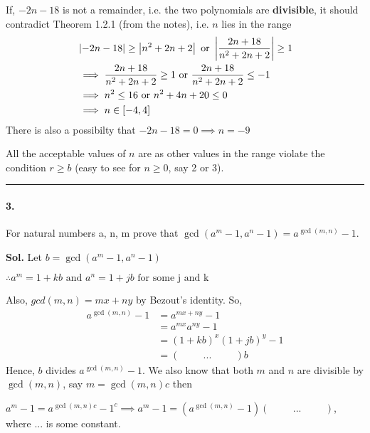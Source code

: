 \documentclass[12pt]{amsart}
\begin{document}
If, $-2n-18$ is not a remainder, i.e. the two polynomials are \textbf{divisible}, it should contradict Theorem 1.2.1 (from the notes), i.e. $n$ lies in the range
\begin{align*}
    &\left|{-2n-18}\right|\geq \left|{n^2+2n+2} \right| \text{ or } \left|\frac{2n+18}{n^2+2n+2}\right|\geq1 \\
    &\implies \frac{2n+18}{n^2+2n+2}\geq1 \text{ or } \frac{2n+18}{n^2+2n+2}\leq-1 \\ 
    \bigskip
    &\implies n^2 \leq 16 \text{ or } n^2+4n+20\leq0 \\
    &\implies n \in [-4, 4]
\end{align*}
\[\]
There is also a possibilty that $-2n-18=0 \implies n=-9 $

All the acceptable values of $n$ are  as other values in the range violate the condition $r \ge b$ (easy to see for $n \ge 0 $, say 2 or 3).


\par\noindent\textcolor{gray}{\rule{\textwidth}{0.5pt}}
\smallskip

\paragraph*{3.} For natural numbers a, n, m prove that $\gcd\left(a^{m}-1,a^{n}-1\right)=a^{\gcd(m,n)}-1$.

\bigskip
\textbf{Sol.}
Let $b = \gcd{(a^{m}-1,a^{n}-1)}$

$
\therefore a^m = 1+kb \text{ and } a^n = 1+jb \text{ for some j and k }
$

Also, $gcd{(m, n)}=mx+ny$ by Bezout’s identity. So,
\begin{align*}
    a^{\gcd(m,n)}-1 &= a^{mx+ny}-1  \\
                    &= a^{mx}a^{ny} - 1 \\
                    &= (1+kb)^x(1+jb)^y - 1 \\
                    &= (\hspace{1cm}  ...  \hspace{1cm})b
\end{align*}
Hence, $b$ divides $a^{\gcd(m,n)}-1$. We also know that both $m$ and $n$ are divisible by $\gcd{(m, n)}$, say $m = \gcd{(m,n)}c$ then

$a^m - 1 = a^{\gcd{(m,n)}c} - 1^c \implies a^m-1 = (a^{\gcd{(m,n)}} - 1)(\hspace{1cm}  ...  \hspace{1cm}) $, where ... is some constant.
\end{document}
